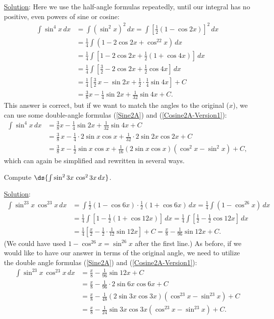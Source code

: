 \underline{Solution}: Here we use the half-angle formulas 
repeatedly, until our integral has no positive, even powers of sine or cosine:
\begin{align*}
\int\sin^4x\,dx&=\int\left(\sin^2x\right)^2\,dx
                =\int\left[\frac12\left(1-\cos2x\right)\right]^2\,dx\\
               &=\frac14\int\left(1-2\cos2x+\cos^22x\right)\,dx\\
               &=\frac14\int\left[1-2\cos2x+\frac12(1+\cos4x)\right]\,dx\\
               &=\frac14\int\left[\frac32-2\cos2x+\frac12\cos4x\right]\,dx\\
          &=\frac14\left[\frac32\,x-\sin2x+\frac12\cdot\frac14\sin4x\right]+C\\
        &=\frac38x-\frac14\sin2x+\frac1{32}\sin4x+C.
\end{align*}
This answer is correct, but if we want to match the angles to the
original ($x$), we can use some double-angle formulas
(\ref{Sine2A}) and (\ref{Cosine2A-Version1}):
\begin{align*}
\int\sin^4x\,dx&=\frac38x-\frac14\sin2x+\frac1{32}\sin4x+C\\
&=\frac38\,x-\frac14\cdot2\sin x\cos x+\frac1{32}\cdot2\sin2x\cos2x+C\\
&=\frac38\,x-\frac12\sin x\cos x+\frac1{16}(2\sin x\cos x)(\cos^2x-\sin^2x)+C,
\end{align*}               
which can again be simplified and rewritten in several ways.
\eex

\bex Compute $\ds{\int\sin^23x\,\cos^23x\,dx}$.

\underline{Solution}: 
\begin{align*}
\int\sin^23x\,\cos^23x\,dx
 &=\int\frac12(1-\cos6x)\cdot\frac12(1+\cos6x)\,dx
  =\frac14\int\left(1-\cos^26x\right)\,dx\\
 &=\frac14\int\left[1-\frac12(1+\cos12x)\right]\,dx
  =\frac14\int\left[\frac12-\frac12\cos12x\right]\,dx\\
 &=\frac14\left[\frac{x}2-\frac12\cdot\frac1{12}\sin12x\right]+C
  =\frac{x}8-\frac1{96}\sin12x+C.
\end{align*}
(We could have used $1-\cos^26x=\sin^26x$ after the first line.)
As before, if we would like to have our answer in terms of the
original angle, we need to utilize the double angle formulas
(\ref{Sine2A}) and (\ref{Cosine2A-Version1}):
\begin{align*}
\int\sin^23x\,\cos^23x\,dx
  &=\frac{x}8-\frac1{96}\sin12x+C\\
  &=\frac{x}8-\frac1{96}\cdot2\sin6x\cos6x+C\\
  &=\frac{x}8-\frac1{48}(2\sin3x\cos3x)(\cos^23x-\sin^23x)+C\\
  &=\frac{x}8-\frac1{24}\sin3x\cos3x(\cos^23x-\sin^23x)+C.
\end{align*}
\eex

